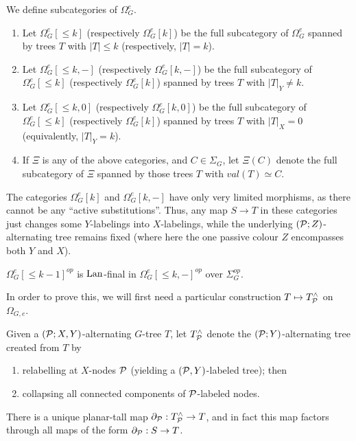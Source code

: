 \documentclass[a4paper,10pt]{article}%
\begin{document}
\begin{definition}
  \label{TREE_FILTRATION_PIECES_DEFINITION}
  We define subcategories of $\Omega_G^e$.
  \begin{enumerate}
  \item Let $\Omega_G^e[\leq k]$ (respectively $\Omega_G^e[k]$) be the full subcategory of $\Omega_G^e$ spanned by trees $T$ with $|T|\leq k$ (respectively, $|T| = k$).
  \item Let $\Omega_G^e[\leq k,-]$ (respectively $\Omega_G^e[k,-]$) be the full subcategory of $\Omega_G^e[\leq k]$ (respectively $\Omega_G^e[k]$) spanned by trees $T$ with $|T|_{Y}\neq k$.
  \item Let $\Omega_G^e[\leq k,0]$ (respectively $\Omega_G^e[k,0]$) be the full subcategory of $\Omega_G^e[\leq k]$ (respectively $\Omega_G^e[k]$) spanned by trees $T$ with $|T|_X = 0$ (equivalently, $|T|_{Y} = k$).
  \item If $\Xi$ is any of the above categories, and $C\in \Sigma_G$, let $\Xi(C)$ denote the full subcategory of $\Xi$ spanned by those trees $T$ with $val(T) \simeq C$.
  \end{enumerate}
\end{definition}

\begin{remark}
  The categories $\Omega_G^e[k]$ and $\Omega_G^e[k,-]$ have only very limited morphisms, as there cannot be any ``active substitutions''. Thus, any map $S \to T$ in these categories just changes some $Y$-labelings into $X$-labelings, while the underlying $(\P; Z)$-alternating tree remains fixed (where here the one passive colour $Z$ encompasses both $Y$ and $X$).
\end{remark}

\begin{lemma}
  \label{MINUS_LAN_FINAL_LEMMA}
  $\Omega_G^e[\leq k-1]^{op}$ is $\Lan$-final in $\Omega_G^{e}[\leq k,-]^{op}$ over $\Sigma_G^{op}$.
\end{lemma}

In order to prove this, we will first need a particular construction $T \mapsto T^\wedge_\P$ on $\Omega_{G,e}$. 

\begin{definition}
  Given a $(\P;X,Y)$-alternating $G$-tree $T$, let $T^\wedge_\P$ denote the $(\P; Y)$-alternating tree created from $T$ by
  \begin{enumerate}
  \item relabelling at $X$-nodes $\P$ (yielding a $(\P,Y)$-labeled tree); then
  \item collapsing all connected components of $\P$-labeled nodes.
  \end{enumerate}
There is a unique planar-tall map $\partial_\P: T^\wedge_\P \to T$, and in fact this map factors through all maps of the form $\partial_\P: S \to T$.
\end{definition}
\end{document}

